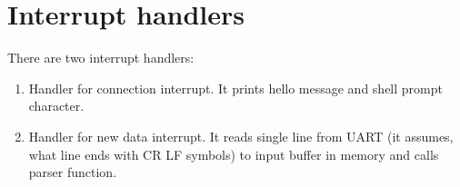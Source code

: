 \section*{Interrupt handlers}

There are two interrupt handlers:

\begin{enumerate}
	\item Handler for connection interrupt. It prints hello message and shell prompt character.
	\item  Handler for new data interrupt. It reads single line from UART (it assumes, what line ends with CR LF symbols) to input buffer in memory and calls parser function.
\end{enumerate}
